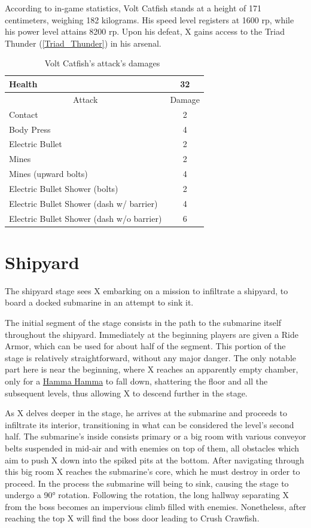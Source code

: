 According to in-game statistics, Volt Catfish stands at a height of 171 centimeters, weighing 182 kilograms. His speed level registers at 1600 rp, while his power level attains 8200 rp. Upon his defeat, X gains access to the Triad Thunder (\ref{Triad_Thunder}) in his arsenal.

\begin{table}[htp]
	\centering
	\begin{tabular}[h]{l c}
		\toprule
		Health  & 32\\
		\midrule
		\multicolumn{1}{c}{Attack} & \multicolumn{1}{c}{Damage}\\
		Contact & 2\\
		Body Press & 4\\
		Electric Bullet& 2\\
		Mines & 2\\
		Mines (upward bolts) & 4\\
		Electric Bullet Shower (bolts)& 2\\
		Electric Bullet Shower (dash w/ barrier)& 4\\
		Electric Bullet Shower (dash w/o barrier)& 6\\
		\bottomrule
	\end{tabular}
	\caption{Volt Catfish's attack's damages~\cite{wiki:Volt_catfish,book:Compendium}}
\end{table} 

\section{Shipyard}
The shipyard stage sees X embarking on a mission to infiltrate a shipyard, to board a docked submarine in an attempt to sink it. 

The initial segment of the stage consists in the path to the submarine itself throughout the shipyard. Immediately at the beginning players are given a Ride Armor, which can be used for about half of the segment. This portion of the stage is relatively straightforward, without any major danger. The only notable part here is near the beginning, where X reaches an apparently empty chamber, only for a  \hyperlink{enem:Hamma_Hamma}{Hamma Hamma} to fall down, shattering the floor and all the subsequent levels, thus allowing X to descend further in the stage.

As X delves  deeper in the stage, he arrives at the submarine and proceeds to infiltrate its interior, transitioning in what can be considered the level's second half. The submarine's inside consists primary or a big room with various conveyor belts suspended in mid-air and with enemies on top of them, all obstacles which aim to push X down into the spiked pits at the bottom. After navigating through this big room X reaches the submarine's core, which he must destroy in order to proceed. In the process the submarine will being to sink, causing the stage to undergo a 90° rotation. Following the rotation, the long hallway separating X from the boss becomes an impervious climb filled with enemies. Nonetheless, after reaching the top X will find the boss door leading to Crush Crawfish.

